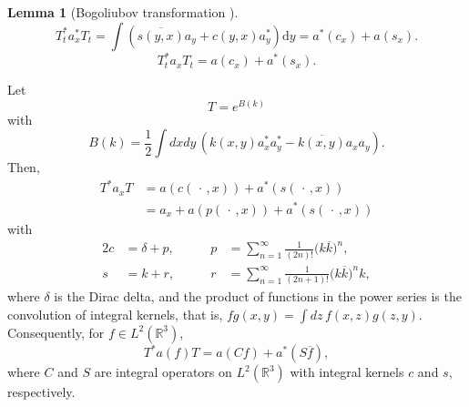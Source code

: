 \documentclass[11pt,a4paper]{scrartcl}
\newtheorem{lem}[thm]{Lemma}
\newcommand{\R}{\mathds{R}}
\newcommand{\di}{\textrm{d}}		%
\newcommand{\cc}[1]{\overline{#1}}	%
\newcommand{\bd}{\begin{displaymath}}			%
\newcommand{\ed}{\end{displaymath}}
\begin{document}
\begin{lem}[Bogoliubov transformation \cite{GMM2010}]
\label{l:bt}
 \bd
 T_t^* a^*_x T_t = \int \left( \cc{s(y,x)} a_y + c(y,x) a^*_y \right) \di y =
 a^*(c_x) + a(s_x).
 \ed
\bd
 T_t^* a_x T_t = a(c_x) + a^*(s_x).
\ed
\end{lem}

Let
\[
  T = e^{B(k)}
\]
with
\[
  B(k) = \frac{1}{2} \int dxdy \, (k(x,y) a_x^* a_y^* - \overline{k(x,y)} a_x
  a_y).
\]
Then,
\begin{align*}
  T^* a_x T & = a(c(\,\cdot\,,x)) + a^*(s(\,\cdot\,,x)) \\
  & = a_x + a(p(\,\cdot\,,x)) + a^*(s(\,\cdot\,,x))
\end{align*}
with
\begin{alignat*}{2}
  c & = \delta + p, & \qquad p & = \sum_{n=1}^\infty \frac{1}{(2n)!} \big( k
  \overline{k} \big)^n, \\
  s & = k + r, & \qquad r & = \sum_{n=1}^\infty \frac{1}{(2n+1)!} \big( k
  \overline{k} \big)^n k,
\end{alignat*}
where $\delta$ is the Dirac delta, and the product of functions in the power
series is the convolution of integral kernels, that is, $fg(x,y) = \int dz \,
f(x,z) g(z,y)$. Consequently, for $f \in L^2(\R^3)$,
\[
  T^* a(f) T = a(Cf) + a^*(S\overline{f}),
\]
where $C$ and $S$ are integral operators on $L^2(\R^3)$ with integral kernels
$c$ and $s$, respectively.
\end{document}
